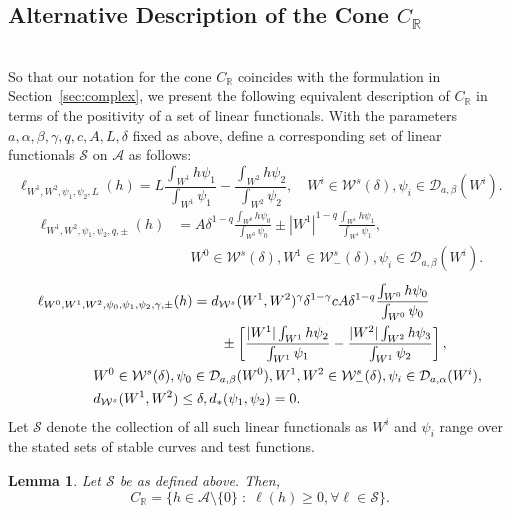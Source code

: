 \documentclass{amsart}
\numberwithin{equation}{section}
\newtheorem{lem}[thm]{Lemma}
\newcommand\cA{{\mathcal A}}
\newcommand\cD{{\mathcal D}}
\newcommand\cS{{\mathcal S}}
\newcommand\cW{{\mathcal W}}
\newcommand\bR{{\mathbb R}}
\begin{document}
\subsection{Alternative Description of the Cone $C_{\bR}$}\ \\
\label{sec:alt cone}
So that our notation for the cone $C_{\bR}$ coincides with the formulation in Section~\ref{sec:complex}, we 
present the following equivalent description of $C_{\bR}$ in terms of the positivity of a set of linear functionals.
With the parameters $a, \alpha, \beta, \gamma, q, c, A, L, \delta$ fixed as above, 
define a corresponding set of linear functionals $\cS$ on $\cA$ as follows:
\begin{equation}
\ell_{W^1, W^2, \psi_1, \psi_2, L}(h) =L\frac{\int_{W^1} h\psi_1}{\int_{W^1} \psi_1}-\frac{\int_{W^2} h\psi_2}{\int_{W^2} \psi_2}, \quad W^i \in \cW^s(\delta), \psi_i \in \cD_{a, \beta}(W^i) .  \label{eq:first linear} 
\end{equation}
\begin{align}
\ell_{W^1, W^2, \psi_1, \psi_2, q, \pm}(h) & =A\delta^{1-q}\frac{\int_{W^0} h\psi_0}{\int_{W^0} \psi_0}\pm |{W^1}|^{1-q}\frac{\int_{W^1} h\psi_1}{\int_{W^1} \psi_1}, \label{eq:second linear} \\
& \quad W^0 \in \cW^s(\delta), W^1 \in \cW^s_-(\delta),  \psi_i \in \cD_{a,\beta}(W^i) . \nonumber
\end{align}
\begin{align}
\ell_{W^0, W^1, W^2, \psi_0, \psi_1, \psi_2, \gamma, \pm}(h) & =d_{\cW^s}(W^1,W^2)^\gamma \delta^{1-\gamma}cA\delta^{1-q}\frac{\int_{W^0} h\psi_0}{\int_{W^0} \psi_0} \label{eq:third linear} \\
& \qquad \pm \left[\frac{|W^1|\int_{W^1} h\psi_2}{\int_{W^1} \psi_1}-\frac{|W^2|\int_{W^2} h\psi_3}{\int_{W^1} \psi_2}\right],
\nonumber \\
& \hskip-2.5cm W^0 \in \cW^s(\delta), \psi_0 \in \cD_{a, \beta}(W^0), W^1, W^2 \in \cW^s_-(\delta), \psi_i \in \cD_{a, \alpha}(W^i) , \nonumber \\
& \hskip-2.5cm d_{\cW^s}(W^1, W^2) \le \delta, d_*(\psi_1, \psi_2) = 0 .   \nonumber
\end{align}
Let $\cS$ denote the collection of all such linear functionals as $W^i$ and $\psi_i$ range over the stated 
sets of stable curves and test functions. 

\begin{lem}
\label{lem:alt}
Let $\cS$ be as defined above.  Then,
\[
C_\bR=\{h\in \cA \setminus \{0\}\;:\; \ell(h)\geq 0, \forall \ell\in\cS\}.
\] 
\end{lem}
\end{document}
